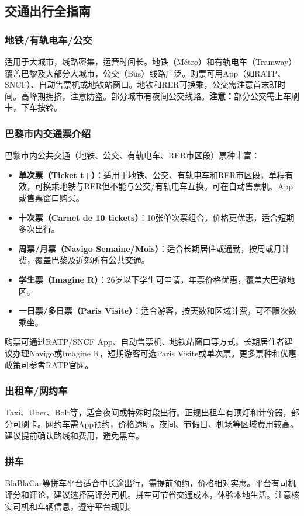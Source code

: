 \subsection{交通出行全指南}

\subsubsection{地铁/有轨电车/公交}
适用于大城市，线路密集，运营时间长。地铁（Métro）和有轨电车（Tramway）覆盖巴黎及大部分大城市，公交（Bus）线路广泛。购票可用App（如RATP、SNCF）、自动售票机或地铁站窗口。地铁和RER可换乘，公交需注意首末班时间。高峰期拥挤，注意防盗。部分城市有夜间公交线路。\textbf{注意：}部分公交需上车刷卡，下车按铃。

\subsubsection{巴黎市内交通票介绍}
巴黎市内公共交通（地铁、公交、有轨电车、RER市区段）票种丰富：
\begin{itemize}
    \item \textbf{单次票（Ticket t+）}：适用于地铁、公交、有轨电车和RER市区段，单程有效，可换乘地铁与RER但不能与公交/有轨电车互换。可在自动售票机、App或售票窗口购买。
    \item \textbf{十次票（Carnet de 10 tickets）}：10张单次票组合，价格更优惠，适合短期多次出行。
    \item \textbf{周票/月票（Navigo Semaine/Mois）}：适合长期居住或通勤，按周或月计费，覆盖巴黎及近郊所有公共交通。
    \item \textbf{学生票（Imagine R）}：26岁以下学生可申请，年票价格优惠，覆盖大巴黎地区。
    \item \textbf{一日票/多日票（Paris Visite）}：适合游客，按天数和区域计费，可不限次数乘坐。
\end{itemize}
购票可通过RATP/SNCF App、自动售票机、地铁站窗口等方式。长期居住者建议办理Navigo或Imagine R，短期游客可选Paris Visite或单次票。更多票种和优惠政策可参考RATP官网。

\subsubsection{出租车/网约车}
Taxi、Uber、Bolt等，适合夜间或特殊时段出行。正规出租车有顶灯和计价器，部分可刷卡。网约车需App预约，价格透明。夜间、节假日、机场等区域费用较高。建议提前确认路线和费用，避免黑车。

\subsubsection{拼车}
BlaBlaCar等拼车平台适合中长途出行，需提前预约，价格相对实惠。平台有司机评分和评论，建议选择高评分司机。拼车可节省交通成本，体验本地生活。注意核实司机和车辆信息，遵守平台规则。

